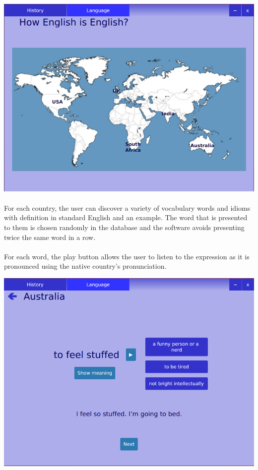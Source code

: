 \documentclass[11pt, a4paper]{report}
\begin{document}
\vspace{0.15cm}
\centerline{\includegraphics[scale=0.5]{images/languageTab.png}}

\paragraph{}For each country, the user can discover a variety of vocabulary words and idioms with definition in standard English and an example. The word that is presented to them is chosen randomly in the database and the software avoids presenting twice the same word in a row.

\paragraph{}For each word, the play button allows the user to listen to the expression as it is pronounced using the native country's pronunciation.

\vspace{0.2cm}
\centerline{\includegraphics[scale=0.5]{images/AustraliaQuestion.png}}
\vspace{-0.35cm}
\end{document}
